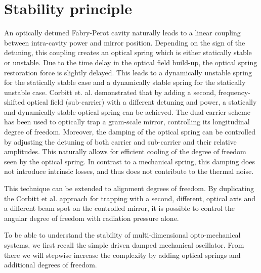 
\section{Stability principle}
\label{sec:II}

An optically detuned Fabry-Perot cavity naturally leads to a linear coupling between intra-cavity power and 
mirror position. Depending on the sign of the detuning, this coupling creates an optical spring which
is either statically stable or unstable. Due to the time delay in the optical field build-up, the optical spring 
restoration force is slightly delayed. This leads to a dynamically unstable spring for the statically stable case
and a dynamically stable spring for the statically unstable case. Corbitt et. al. \cite{Corbitt07} demonstrated that by adding a second, frequency-shifted optical field (sub-carrier) with a different detuning and power, a statically and dynamically stable optical spring can be achieved. The dual-carrier scheme has been used to optically trap a gram-scale mirror, controlling its longitudinal degree of freedom.
Moreover, the damping of the optical spring can be controlled by adjusting the detuning of both carrier and sub-carrier and their relative amplitudes. This naturally allows for efficient cooling of the degree of freedom seen by the optical spring. In contrast to a mechanical spring, this damping does not introduce intrinsic losses, and thus does not contribute to the thermal noise.

This technique can be extended to alignment degrees of freedom. By duplicating the Corbitt et al. approach for trapping 
with a second, different, optical axis and a different beam spot on the controlled mirror, it is possible to control the angular 
degree of freedom with radiation pressure alone.

To be able to understand the stability of multi-dimensional opto-mechanical systems, we first recall the simple driven damped mechanical oscillator. From there we will stepwise increase the complexity by adding optical springs and additional degrees of freedom. 

